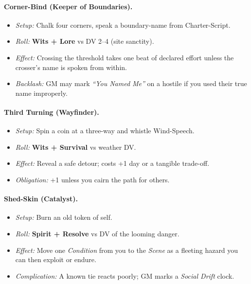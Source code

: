 \begin{multicols}{2}
\paragraph{Corner-Bind (Keeper of Boundaries).}
\begin{itemize}
  \item \emph{Setup:} Chalk four corners, speak a boundary-name from Charter-Script.
  \item \emph{Roll:} \textbf{Wits + Lore} vs DV 2–4 (site sanctity).
  \item \emph{Effect:} Crossing the threshold takes one beat of declared effort unless the crosser’s name is spoken from within.
  \item \emph{Backlash:} GM may mark \emph{“You Named Me”} on a hostile if you used their true name improperly.
\end{itemize}

\paragraph{Third Turning (Wayfinder).}
\begin{itemize}
  \item \emph{Setup:} Spin a coin at a three-way and whistle Wind-Speech. 
  \item \emph{Roll:} \textbf{Wits + Survival} vs weather DV.
  \item \emph{Effect:} Reveal a safe detour; costs +1 day or a tangible trade-off.
  \item \emph{Obligation:} +1 unless you cairn the path for others.
\end{itemize}

\paragraph{Shed-Skin (Catalyst).}
\begin{itemize}
  \item \emph{Setup:} Burn an old token of self.
  \item \emph{Roll:} \textbf{Spirit + Resolve} vs DV of the looming danger.
  \item \emph{Effect:} Move one \emph{Condition} from you to the \emph{Scene} as a fleeting hazard you can then exploit or endure.
  \item \emph{Complication:} A known tie reacts poorly; GM marks a \emph{Social Drift} clock.
\end{itemize}


\end{multicols}
